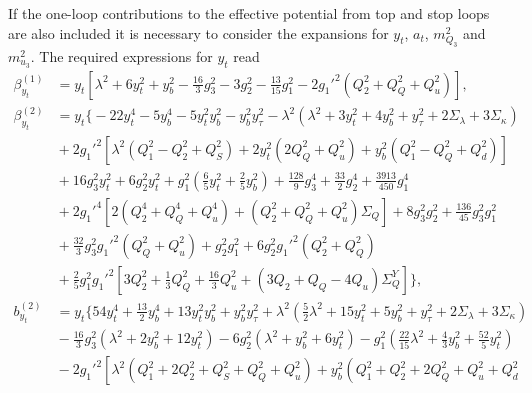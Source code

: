 \documentclass[preprint,amsmath,amssymb,aps,superscriptaddress,prd,
showpacs,floatfix,nofootinbib]{revtex4-1}
\begin{document}
If the one-loop contributions to the effective potential from top and stop
loops are also included it is necessary to consider the expansions for $y_t$,
$a_t$, $m_{Q_3}^2$ and $m_{u_3}^2$. The required expressions for $y_t$ read
\begin{subequations}
\begin{align}
\beta_{y_t}^{(1)} &= y_t \left [ \lambda^2 + 6 y_t^2 + y_b^2 -
\frac{16}{3} g_3^2 - 3 g_2^2 - \frac{13}{15} g_1^2 - 2 g_1'^2 \left ( Q_2^2 +
Q_Q^2 + Q_u^2 \right ) \right ] , \label{eq:USSMYu22BetaOneLoop} \\
\beta_{y_t}^{(2)} &= y_t \bigg \{ -22 y_t^4 - 5 y_b^4 - 5 y_t^2 y_b^2 -
y_b^2 y_\tau^2 - \lambda^2 \left ( \lambda^2 + 3 y_t^2 + 4 y_b^2 + y_\tau^2 +
2 \Sigma_\lambda + 3 \Sigma_\kappa \right ) \nonumber \\
& {} + 2 g_1'^2 \left [ \lambda^2 \left ( Q_1^2 - Q_2^2 + Q_S^2 \right ) +
2 y_t^2 \left ( 2 Q_Q^2 + Q_u^2 \right ) + y_b^2 \left ( Q_1^2 - Q_Q^2 +
Q_d^2 \right ) \right ] \nonumber \\
& {} + 16 g_3^2 y_t^2 + 6 g_2^2 y_t^2 + g_1^2 \left ( \frac{6}{5} y_t^2 +
\frac{2}{5} y_b^2 \right ) + \frac{128}{9} g_3^4 + \frac{33}{2} g_2^4 +
\frac{3913}{450} g_1^4 \nonumber \\
& {} + 2 g_1'^4 \left [ 2 \left ( Q_2^4 + Q_Q^4 + Q_u^4 \right ) +
\left ( Q_2^2 + Q_Q^2 + Q_u^2 \right ) \Sigma_{Q} \right ] + 8 g_3^2 g_2^2 +
\frac{136}{45} g_3^2 g_1^2 \nonumber \\
& {} + \frac{32}{3} g_3^2 g_1'^2 \left ( Q_Q^2 + Q_u^2 \right ) + g_2^2 g_1^2
+ 6 g_2^2 g_1'^2 \left ( Q_2^2 + Q_Q^2 \right ) \nonumber \\
& {} + \frac{2}{5} g_1^2 g_1'^2 \left [ 3 Q_2^2 + \frac{1}{3} Q_Q^2 +
\frac{16}{3} Q_u^2 + \left ( 3 Q_2 + Q_Q - 4 Q_u \right ) \Sigma_Q^Y \right ]
\bigg \} , \label{eq:USSMYu22BetaTwoLoop} \\
b_{y_t}^{(2)} &= y_t \bigg \{ 54 y_t^4 + \frac{13}{2} y_b^4 + 13 y_t^2 y_b^2
+ y_b^2 y_\tau^2 + \lambda^2 \left ( \frac{5}{2} \lambda^2 + 15 y_t^2 +
5 y_b^2 + y_\tau^2 + 2 \Sigma_\lambda + 3 \Sigma_\kappa \right ) \nonumber \\
& {} - \frac{16}{3} g_3^2 \left ( \lambda^2 + 2 y_b^2 + 12 y_t^2 \right ) -
6 g_2^2 \left ( \lambda^2 + y_b^2 + 6 y_t^2 \right ) -
g_1^2 \left ( \frac{22}{15} \lambda^2 + \frac{4}{3} y_b^2 + \frac{52}{5} y_t^2
\right ) \nonumber \\
& {} - 2 g_1'^2 \left [ \lambda^2 \left ( Q_1^2 + 2 Q_2^2 + Q_S^2 + Q_Q^2 +
Q_u^2 \right ) + y_b^2 \left ( Q_1^2 + Q_2^2 + 2 Q_Q^2 + Q_u^2 + Q_d^2

\end{align}
\end{subequations}
\end{document}

